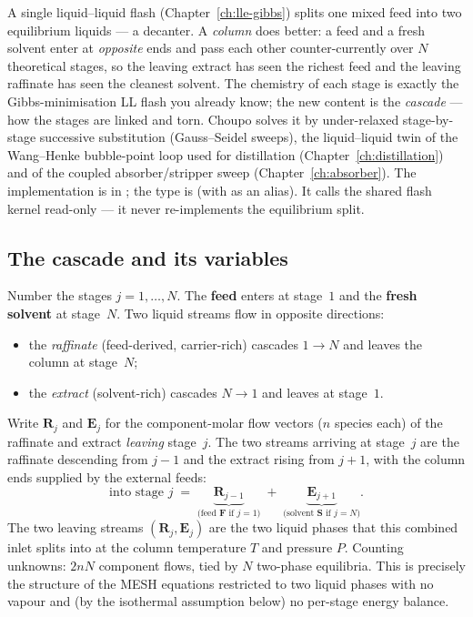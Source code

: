 \documentclass[11pt,a4paper]{article}
\begin{document}
\begin{whatyoulllearn}
A single liquid--liquid flash (Chapter~\ref{ch:lle-gibbs}) splits one
mixed feed into two equilibrium liquids --- a decanter. A
\emph{column} does better: a feed and a fresh solvent enter at
\emph{opposite} ends and pass each other counter-currently over $N$
theoretical stages, so the leaving extract has seen the richest feed and
the leaving raffinate has seen the cleanest solvent. The chemistry of
each stage is exactly the Gibbs-minimisation LL flash you already know;
the new content is the \emph{cascade} --- how the stages are linked and
torn. Choupo solves it by under-relaxed stage-by-stage successive
substitution (Gauss--Seidel sweeps), the liquid--liquid twin of the
Wang--Henke bubble-point loop used for distillation
(Chapter~\ref{ch:distillation}) and of the coupled absorber/stripper
sweep (Chapter~\ref{ch:absorber}). The implementation is in
; the type is
 (with  as an alias). It calls the shared
flash kernel  read-only --- it never
re-implements the equilibrium split.
\end{whatyoulllearn}

\subsection{The cascade and its variables}

Number the stages $j = 1, \ldots, N$. The \textbf{feed} enters at
stage~$1$ and the \textbf{fresh solvent} at stage~$N$. Two liquid
streams flow in opposite directions:
\begin{itemize}[leftmargin=*]
  \item the \emph{raffinate} (feed-derived, carrier-rich) cascades
        $1 \to N$ and leaves the column at stage~$N$;
  \item the \emph{extract} (solvent-rich) cascades $N \to 1$ and leaves
        at stage~$1$.
\end{itemize}
Write $\mathbf{R}_j$ and $\mathbf{E}_j$ for the component-molar flow
vectors ($n$ species each) of the raffinate and extract \emph{leaving}
stage~$j$. The two streams arriving at stage~$j$ are the raffinate
descending from $j-1$ and the extract rising from $j+1$, with the column
ends supplied by the external feeds:
\begin{equation}
   \text{into stage } j \;=\;
   \underbrace{\mathbf{R}_{j-1}}_{\text{(feed }\mathbf{F}\text{ if }j=1)}
   \;+\;
   \underbrace{\mathbf{E}_{j+1}}_{\text{(solvent }\mathbf{S}\text{ if }j=N)} .
   \label{eq:extractor-inlet}
\end{equation}
The two leaving streams $(\mathbf{R}_j, \mathbf{E}_j)$ are the two liquid
phases that this combined inlet splits into at the column temperature $T$
and pressure $P$. Counting unknowns: $2nN$ component flows, tied by $N$
two-phase equilibria. This is precisely the structure of the MESH
equations restricted to two liquid phases with no vapour and (by the
isothermal assumption below) no per-stage energy balance.
\end{document}
